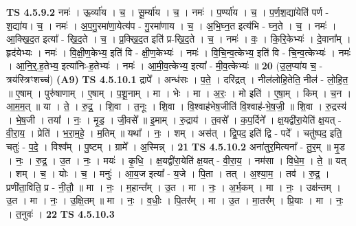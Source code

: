 \documentclass[17pt]{extarticle}
\begin{document}
                  \newline
                                \textbf{ TS 4.5.9.2} \newline
                  नमः॑ । ऊ॒र्व्या॑य । च॒ । सू॒र्म्या॑य । च॒ । नमः॑ । प॒र्ण्या॑य । च॒ । प॒र्ण॒श॒द्या॑येति॑ पर्ण - श॒द्या॑य। च॒ । नमः॑ । अ॒प॒गु॒रमा॑णा॒येत्य॑प - गु॒रमा॑णाय । च॒ । अ॒भि॒घ्न॒त इत्य॑भि - घ्न॒ते । च॒ । नमः॑ । आ॒क्खि॒द॒त इत्या᳚ - खि॒द॒ते । च॒ । प्र॒क्खि॒द॒त इति॑ प्र-खि॒द॒ते । च॒ । नमः॑ । वः॒ । कि॒रि॒केभ्यः॑ । दे॒वाना᳚म् । हृद॑येभ्यः । नमः॑ । वि॒क्षी॒ण॒केभ्य॒ इति॑ वि - क्षी॒ण॒केभ्यः॑ । नमः॑ । वि॒चि॒न्व॒त्केभ्य॒ इति॑ वि - चि॒न्व॒त्केभ्यः॑ । नमः॑ । आ॒नि॒र्॒.ह॒तेभ्य॒ इत्या॑निः-ह॒तेभ्यः॑ । नमः॑ । आ॒मी॒व॒त्केभ्य॒ इत्या᳚ - मी॒व॒त्केभ्यः॑ ॥ \textbf{  20} \newline
                  \newline
                      (उ॒ल॒प्या॑य च॒ - त्रय॑स्त्रिꣳशच्च॑)  \textbf{(A9)} \newline \newline
                                \textbf{ TS 4.5.10.1} \newline
                  द्रापे᳚ । अन्ध॑सः । प॒ते॒ । दरि॑द्रत् । नील॑लोहि॒तेति॒ नील॑ - लो॒हि॒त॒ ॥ ए॒षाम् । पुरु॑षाणाम् । ए॒षाम् । प॒शू॒नाम् । मा । भेः । मा । अ॒रः॒ । मो इति॑ । ए॒षा॒म् । किम् । च॒न । आ॒म॒म॒त् ॥ या । ते॒ । रु॒द्र॒ । शि॒वा । त॒नूः । शि॒वा । वि॒श्वाह॑भेष॒जीति॑ वि॒श्वाह॑-भे॒ष॒जी॒ ॥ शि॒वा । रु॒द्रस्य॑ । भे॒ष॒जी । तया᳚ । नः॒ । मृ॒ड॒ । जी॒वसे᳚ ॥ इ॒माम् । रु॒द्राय॑ । त॒वसे᳚ । क॒प॒र्दिने᳚ । क्ष॒यद्वी॑रा॒येति॑ क्ष॒यत् - वी॒रा॒य॒ । प्रेति॑ । भ॒रा॒म॒हे॒ । म॒तिम् ॥ यथा᳚ । नः॒ । शम् । अस॑त् । द्वि॒पद॒ इति॑ द्वि - पदे᳚ । चतु॑ष्पद॒ इति॒ चतुः॑ - प॒दे॒ । विश्व᳚म् । पु॒ष्टम् । ग्रामे᳚ । अ॒स्मिन्न् । \textbf{  21} \newline
                  \newline
                                \textbf{ TS 4.5.10.2} \newline
                  अना॑तुर॒मित्यना᳚ - तु॒र॒म् ॥ मृ॒ड । नः॒ । रु॒द्र॒ । उ॒त । नः॒ । मयः॑ । कृ॒धि॒ । क्ष॒यद्वी॑रा॒येति॑ क्ष॒यत् - वी॒रा॒य॒ । नम॑सा । वि॒धे॒म॒ । ते॒ ॥ यत् । शम् । च॒ । योः । च॒ । मनुः॑ । आ॒य॒ज इत्या᳚ - य॒जे । पि॒ता । तत् । अ॒श्या॒म॒ । तव॑ । रु॒द्र॒ । प्रणी॑ता॒विति॒ प्र - नी॒तौ॒ ॥ मा । नः॒ । म॒हान्त᳚म् । उ॒त । मा । नः॒ । अ॒र्भ॒कम् । मा । नः॒ । उक्ष॑न्तम् । उ॒त । मा । नः॒ । उ॒क्षि॒तम् ॥ मा । नः॒ । व॒धीः॒ । पि॒तर᳚म् । मा । उ॒त । मा॒तर᳚म् । प्रि॒याः । मा । नः॒ । त॒नुवः॑ । \textbf{  22} \newline
                  \newline
                                \textbf{ TS 4.5.10.3} \newline
\end{document}
